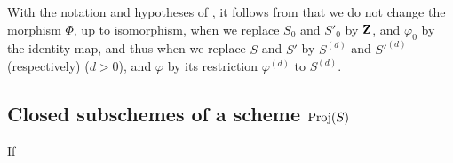 \begin{env}[2.8.15]
\label{II.2.8.15}
With the notation and hypotheses of , it follows from  that we do not change the morphism $\Phi$, up to isomorphism, when we replace $S_0$ and $S'_0$ by $\mathbf{Z}$, and $\varphi_0$ by the identity map, and thus when we replace $S$ and $S'$ by $S^{(d)}$ and ${S'}^{(d)}$ (respectively) ($d>0$), and $\varphi$ by its restriction $\varphi^{(d)}$ to $S^{(d)}$.
\end{env}


\subsection{Closed subschemes of a scheme $\operatorname{Proj}(S)$}
\label{subsection:II.2.9}

\begin{env}[2.9.1]
\label{II.2.9.1}
If
\end{env}
